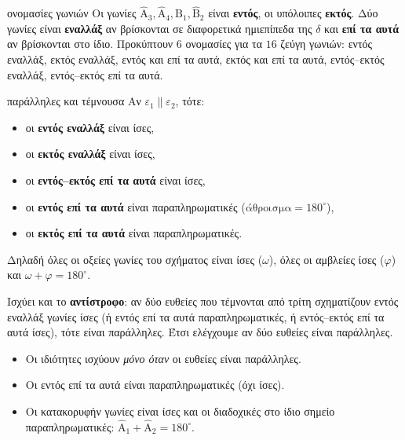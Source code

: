 \begin{orismos}{ονομασίες γωνιών}
Οι γωνίες $\hat{\mathrm{Α}}_3,\hat{\mathrm{Α}}_4,\hat{\mathrm{Β}}_1,\hat{\mathrm{Β}}_2$ είναι \textbf{εντός}, οι υπόλοιπες \textbf{εκτός}. Δύο γωνίες είναι \textbf{εναλλάξ} αν βρίσκονται σε διαφορετικά ημιεπίπεδα της $\delta$ και \textbf{επί τα αυτά} αν βρίσκονται στο ίδιο. Προκύπτουν $6$ ονομασίες για τα $16$ ζεύγη γωνιών: εντός εναλλάξ, εκτός εναλλάξ, εντός και επί τα αυτά, εκτός και επί τα αυτά, εντός--εκτός εναλλάξ, εντός--εκτός επί τα αυτά.
\end{orismos}

\begin{kanonas}{παράλληλες και τέμνουσα}
Αν $\varepsilon_1\parallel\varepsilon_2$, τότε:
\begin{itemize}[leftmargin=1.2em,itemsep=0.3ex,topsep=2pt]
\item οι \textbf{εντός εναλλάξ} είναι ίσες,
\item οι \textbf{εκτός εναλλάξ} είναι ίσες,
\item οι \textbf{εντός--εκτός επί τα αυτά} είναι ίσες,
\item οι \textbf{εντός επί τα αυτά} είναι παραπληρωματικές ($\text{άθροισμα}=180^\circ$),
\item οι \textbf{εκτός επί τα αυτά} είναι παραπληρωματικές.
\end{itemize}
Δηλαδή όλες οι οξείες γωνίες του σχήματος είναι ίσες ($\omega$), όλες οι αμβλείες ίσες ($\varphi$) και $\omega+\varphi=180^\circ$.
\end{kanonas}

Ισχύει και το \textbf{αντίστροφο}: αν δύο ευθείες που τέμνονται από τρίτη σχηματίζουν εντός εναλλάξ γωνίες ίσες (ή εντός επί τα αυτά παραπληρωματικές, ή εντός--εκτός επί τα αυτά ίσες), τότε είναι παράλληλες. Έτσι ελέγχουμε αν δύο ευθείες είναι παράλληλες.

\begin{prosoxi}
\begin{itemize}[leftmargin=1.2em,itemsep=0.3ex,topsep=2pt]
\item Οι ιδιότητες ισχύουν \emph{μόνο όταν} οι ευθείες είναι παράλληλες.
\item Οι εντός επί τα αυτά είναι παραπληρωματικές (όχι ίσες).
\item Οι κατακορυφήν γωνίες είναι ίσες και οι διαδοχικές στο ίδιο σημείο παραπληρωματικές: $\hat{\mathrm{Α}}_1+\hat{\mathrm{Α}}_2=180^\circ$.
\end{itemize}
\end{prosoxi}

